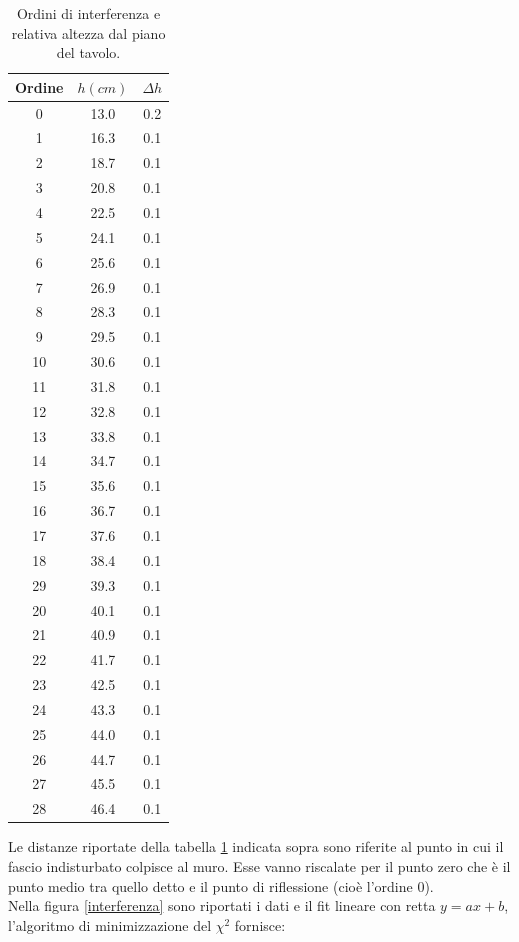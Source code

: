 \documentclass[10pt,a4paper]{article}
\begin{document}
\begin{table}[!htb]
\centering
\begin{tabular}{|c|c|c|}
\hline
Ordine & $h (cm)$ & $ \Delta h$ \\
\hline
0	&	13.0	&	0.2\\
1	&	16.3	&	0.1\\
2	&	18.7	&	0.1\\
3	&	20.8	&	0.1\\
4	&	22.5	&	0.1\\
5	&	24.1	&	0.1\\
6	&	25.6	&	0.1\\
7	&	26.9	&	0.1\\
8	&	28.3	&	0.1\\
9	&	29.5	&	0.1\\
10	&	30.6	&	0.1\\
11	&	31.8	&	0.1\\
12	&	32.8	&	0.1\\
13	&	33.8	&	0.1\\
14	&	34.7	&	0.1\\
15	&	35.6	&	0.1\\
16	&	36.7	&	0.1\\
17	&	37.6	&	0.1\\
18	&	38.4	&	0.1\\
29	&	39.3	&	0.1\\
20	&	40.1	&	0.1\\
21	&	40.9	&	0.1\\
22	&	41.7	&	0.1\\
23	&	42.5	&	0.1\\
24	&	43.3	&	0.1\\
25	&	44.0	&	0.1\\
26	&	44.7	&	0.1\\
27	&	45.5	&	0.1\\
28	&	46.4	&	0.1\\
\hline
\end{tabular}
\caption{Ordini di interferenza e relativa altezza dal piano del tavolo.}
\label{Ordini}
\end{table}

Le distanze riportate della tabella \ref{Ordini} indicata sopra sono riferite al punto in cui il fascio indisturbato colpisce al muro. Esse vanno riscalate per il punto zero che è il punto medio tra quello detto e il punto di riflessione (cioè l'ordine 0).\\

Nella figura \ref{interferenza} sono riportati i dati e il fit lineare con retta $y = ax+b$, l'algoritmo di minimizzazione del $\chi^2$ fornisce: 
\end{document}
